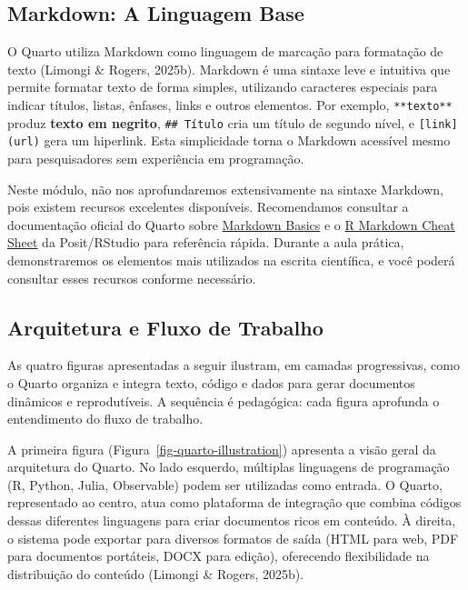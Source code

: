 \documentclass[
  a4paper,
]{book}
\begin{document}
\subsection{Markdown: A Linguagem Base}\label{markdown-a-linguagem-base}

O Quarto utiliza Markdown como linguagem de marcação para formatação de
texto (Limongi \& Rogers, 2025b). Markdown é uma sintaxe leve e
intuitiva que permite formatar texto de forma simples, utilizando
caracteres especiais para indicar títulos, listas, ênfases, links e
outros elementos. Por exemplo, \texttt{**texto**} produz \textbf{texto
em negrito}, \texttt{\#\#\ Título} cria um título de segundo nível, e
\texttt{{[}link{]}(url)} gera um hiperlink. Esta simplicidade torna o
Markdown acessível mesmo para pesquisadores sem experiência em
programação.

Neste módulo, não nos aprofundaremos extensivamente na sintaxe Markdown,
pois existem recursos excelentes disponíveis. Recomendamos consultar a
documentação oficial do Quarto sobre
\href{https://quarto.org/docs/authoring/markdown-basics.html}{Markdown
Basics} e o
\href{https://posit.co/wp-content/uploads/2022/10/rmarkdown-1.pdf}{R
Markdown Cheat Sheet} da Posit/RStudio para referência rápida. Durante a
aula prática, demonstraremos os elementos mais utilizados na escrita
científica, e você poderá consultar esses recursos conforme necessário.

\subsection{Arquitetura e Fluxo de
Trabalho}\label{arquitetura-e-fluxo-de-trabalho}

As quatro figuras apresentadas a seguir ilustram, em camadas
progressivas, como o Quarto organiza e integra texto, código e dados
para gerar documentos dinâmicos e reprodutíveis. A sequência é
pedagógica: cada figura aprofunda o entendimento do fluxo de trabalho.

A primeira figura (Figura~\ref{fig-quarto-illustration}) apresenta a
visão geral da arquitetura do Quarto. No lado esquerdo, múltiplas
linguagens de programação (R, Python, Julia, Observable) podem ser
utilizadas como entrada. O Quarto, representado ao centro, atua como
plataforma de integração que combina códigos dessas diferentes
linguagens para criar documentos ricos em conteúdo. À direita, o sistema
pode exportar para diversos formatos de saída (HTML para web, PDF para
documentos portáteis, DOCX para edição), oferecendo flexibilidade na
distribuição do conteúdo (Limongi \& Rogers, 2025b).
\end{document}
